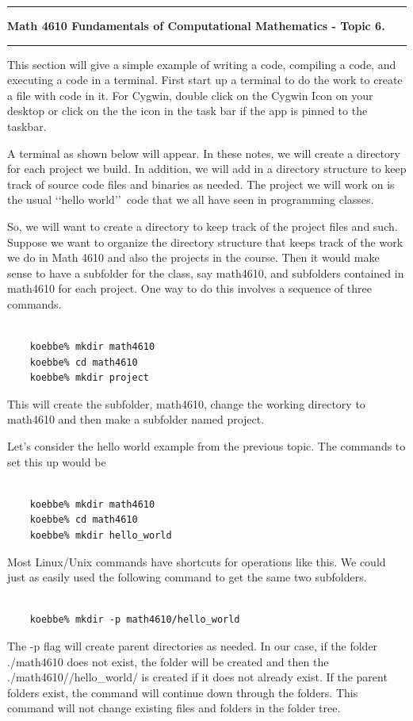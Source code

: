 \documentclass[10pt,fleqn]{article}
\begin{document}
\vskip0.1in\hrule\vskip0.1in
\noindent
{\large{\bf Math 4610 Fundamentals of Computational Mathematics - Topic 6.}}
\vskip0.1in\hrule\vskip0.1in

This section will give a simple example of writing a code, compiling a code, and
executing a code in a terminal. First start up a terminal to do the work to
create a file with code in it. For Cygwin, double click on the Cygwin Icon on
your desktop or click on the the icon in the task bar if the app is pinned to
the taskbar.

A terminal as shown below will appear. In these notes, we will create a
directory for each project we build. In addition, we will add in a directory
structure to keep track of source code files and binaries as needed. The project
we will work on is the usual \lq\lq hello world\rq\rq\ code that we all have
seen in programming classes.

So, we will want to create a directory to keep track of the project files and
such. Suppose we want to organize the directory structure that keeps track of
the work we do in Math 4610 and also the projects in the course. Then it would
make sense to have a subfolder for the class, say math4610, and subfolders
contained in math4610 for each project. One way to do this involves a sequence
of three commands.
\begin{verbatim} 

    koebbe% mkdir math4610
    koebbe% cd math4610
    koebbe% mkdir project

\end{verbatim} 
This will create the subfolder, math4610, change the working directory to
math4610 and then make a subfolder named project.

Let's consider the hello world example from the previous topic. The commands
to set this up would be
\begin{verbatim} 

    koebbe% mkdir math4610
    koebbe% cd math4610
    koebbe% mkdir hello_world 

\end{verbatim} 
Most Linux/Unix commands have shortcuts for operations like this. We could just
as easily used the following command to get the same two subfolders.
\begin{verbatim}

    koebbe% mkdir -p math4610/hello_world

\end{verbatim}
The -p flag will create parent directories as needed. In our case, if the folder
./math4610 does not exist, the folder will be created and then the
./math4610//hello\_world/ is created if it does not already exist. If the parent
folders exist, the command will continue down through the folders. This command
will not change existing files and folders in the folder tree.
\end{document}
